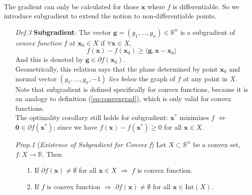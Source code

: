 \documentclass[a4paper, 11pt]{book}
\begin{document}
~\\
The gradient can only be calculated for those $\bm{x}$ where $f$ is differentiable. So we introduce subgradient to extend the notion to non-differentiable points.
\begin{itemize}
  \item[\textit{Def.3}] \textbf{Subgradient}: The vector $\bm{g}=(g_1, ..., g_n)\in \mathbb{R}^n$ is a subgradient of \textit{convex function} $f$ at $\bm{x}_0\in X$ if $\forall \bm{x} \in X$,
  \begin{equation}\label{eq:subgrad}
    f(\bm{x}) - f(\bm{x}_0) \geq \langle \bm{g}, \bm{x-x}_0 \rangle
  \end{equation}
  And this is denoted by $\bm{g}\in \partial f(\bm{x}_0)$.\\
  Geometrically, this relation says that the plane determined by point $\bm{x}_0$ and normal vector $(g_1, ..., g_n, -1)$ \emph{lies below} the graph of $f$ at any point in $X$.\\
  Note that subgradient is defined specifically for convex functions, because it is an analogy to definition (\ref{eq:convexgrad}), which is only valid for convex functions.\\
  The optimality corollary still holds for subgradient: $\bm{x}^*$ minimizes $f$ $\iff$ $\bm{0}\in \partial f(\bm{x}^*)$; since we have $f(\bm{x}) - f(\bm{x}^*) \geq 0$ for all $\bm{x}\in X$. 
  ~\\
  \item[\textit{Prop.1}] (\textit{Existence of Subgradient for Convex f}) Let $X\subset \mathbb{R}^n$ be a convex set, $f: X\to \mathbb{R}$. Then
  \begin{itemize}
    \item[1.] If $\partial f(\bm{x})\ne \emptyset$ for all $\bm{x}\in X$ $\Rightarrow$ $f$ is convex function.
    \item[2.] If $f$ is convex function $\Rightarrow$ $\partial f(\bm{x})\ne \emptyset$ for all $\bm{x}\in \text{Int}(X)$.
  \end{itemize}
\end{itemize}
\end{document}
